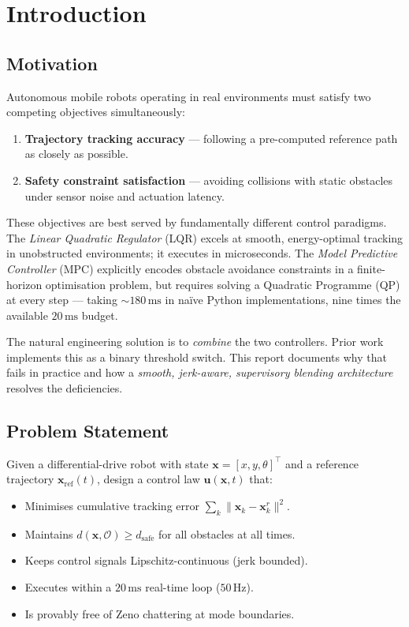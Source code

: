 \documentclass[12pt,a4paper,oneside]{report}
\begin{document}
\chapter{Introduction}\label{ch:intro}

\section{Motivation}

Autonomous mobile robots operating in real environments must satisfy two
competing objectives simultaneously:
\begin{enumerate}
  \item \textbf{Trajectory tracking accuracy} --- following a pre-computed
    reference path as closely as possible.
  \item \textbf{Safety constraint satisfaction} --- avoiding collisions with
    static obstacles under sensor noise and actuation latency.
\end{enumerate}

These objectives are best served by fundamentally different control paradigms.
The \textit{Linear Quadratic Regulator} (LQR) excels at smooth,
energy-optimal tracking in unobstructed environments; it executes in
microseconds. The \textit{Model Predictive Controller} (MPC) explicitly
encodes obstacle avoidance constraints in a finite-horizon optimisation
problem, but requires solving a Quadratic Programme (QP) at every step ---
taking \(\sim\!180\,\text{ms}\) in na\"{i}ve Python implementations, nine
times the available \(20\,\text{ms}\) budget.

The natural engineering solution is to \textit{combine} the two controllers.
Prior work implements this as a binary threshold switch. This report documents
why that fails in practice and how a \textit{smooth, jerk-aware, supervisory
blending architecture} resolves the deficiencies.

\section{Problem Statement}

Given a differential-drive robot with state
\(\mathbf{x} = [x,y,\theta]^\top\) and a reference trajectory
\(\mathbf{x}_{\mathrm{ref}}(t)\), design a control law
\(\mathbf{u}(\mathbf{x},t)\) that:
\begin{itemize}
  \item Minimises cumulative tracking error
    \(\sum_k\|\mathbf{x}_k - \mathbf{x}^r_k\|^2\).
  \item Maintains \(d(\mathbf{x},\mathcal{O}) \geq d_{\mathrm{safe}}\)
    for all obstacles at all times.
  \item Keeps control signals Lipschitz-continuous (jerk bounded).
  \item Executes within a \(20\,\text{ms}\) real-time loop (\(50\,\text{Hz}\)).
  \item Is provably free of Zeno chattering at mode boundaries.
\end{itemize}
\end{document}
